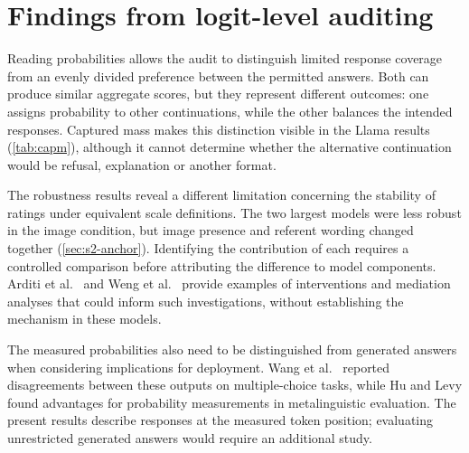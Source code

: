 \section{Findings from logit-level auditing}\label{sec:disc-logit}

Reading probabilities allows the audit to distinguish limited response
coverage from an evenly divided preference between the permitted answers.
Both can produce similar aggregate scores, but they represent different
outcomes: one assigns probability to other continuations, while the other
balances the intended responses. Captured mass makes this distinction visible
in the Llama results (\cref{tab:capm}), although it cannot determine whether
the alternative continuation would be refusal, explanation or another format.

The robustness results reveal a different limitation concerning the stability
of ratings under equivalent scale definitions. The two largest models were
less robust in the image condition, but image presence and referent wording
changed together (\cref{sec:s2-anchor}). Identifying the contribution of each
requires a controlled comparison before attributing the difference to model
components. Arditi et al.\ \cite{arditi2024refusal} and Weng et al.\
\cite{weng2024images} provide examples of interventions and mediation analyses
that could inform such investigations, without establishing the mechanism in
these models.

The measured probabilities also need to be distinguished from generated
answers when considering implications for deployment. Wang et al.\
\cite{wang2024myanswer} reported disagreements between these outputs on
multiple-choice tasks, while Hu and Levy \cite{hu2023prompting} found
advantages for probability measurements in metalinguistic evaluation.
The present results describe responses at the measured token position;
evaluating unrestricted generated answers would require an additional study.


